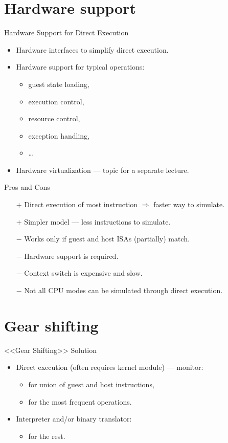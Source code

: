 \section{Hardware support}

\begin{frame}{Hardware Support for Direct Execution}
\begin{itemize}
\item Hardware interfaces to simplify direct execution.
\item Hardware support for typical operations:
\begin{itemize}
\item guest state loading,
\item execution control,
\item resource control,
\item exception handling,
\item \dots
\end{itemize}
\pause
\item Hardware virtualization --- topic for a separate lecture.
\end{itemize}
\end{frame}

\begin{frame}{Pros and Cons}
\begin{itemize}
\item[$+$] Direct execution of most instruction $\Rightarrow$ faster way to simulate.
\item[$+$] Simpler model --- less instructions to simulate.
\item[$-$] Works only if guest and host ISAs (partially) match.
\item[$-$] Hardware support is required.
\item[$-$] Context switch is expensive and slow.
\item[$-$] Not all CPU modes can be simulated through direct execution.
\end{itemize}
\end{frame}

\section{Gear shifting}

\begin{frame}{<<Gear Shifting>> Solution}
\begin{itemize}
\item Direct execution (often requires kernel module) --- monitor:
\begin{itemize}
\item for union of guest and host instructions,
\item for the most frequent operations.
\end{itemize}
\item Interpreter and/or binary translator:
\begin{itemize}
\item for the rest.
\end{itemize}
\end{itemize}
\end{frame}

